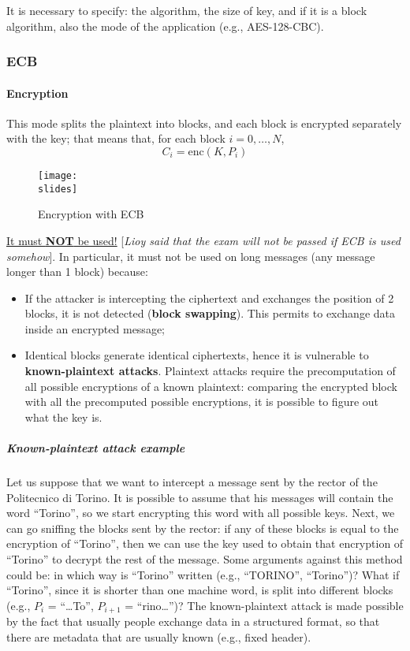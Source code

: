 It is necessary to specify: 
the algorithm, the size of key, and if it is a block algorithm, also the mode of the application (e.g., AES-128-CBC).


\subsubsection{ECB}
\paragraph*{Encryption}
This mode splits the plaintext into blocks, and each block is encrypted separately with the key; 
that means that, for each block \(i = 0, \ldots, N\),
\[
C_i = \text{enc}(K, P_i) 
\]
\begin{figure}[h]
    \centering
    \texttt{[image: \\slides]}
    \caption*{Encryption with ECB}
\end{figure}

\underline{It must \textbf{NOT} be used!} [\textit{Lioy said that the exam will not be passed if ECB is used somehow}]. 
In particular, it must not be used on long messages (any message longer than 1 block) because:
\begin{itemize}
  \item If the attacker is intercepting the ciphertext and exchanges the position of 2 blocks, it is not detected (\textbf{block swapping}). This permits to exchange data inside an encrypted message;
  \item Identical blocks generate identical ciphertexts, hence it is vulnerable to \textbf{known-plaintext attacks}. Plaintext attacks require the precomputation of all possible encryptions of a known plaintext: comparing the encrypted block with all the precomputed possible encryptions, it is possible to figure out what the key is.  
\end{itemize}

\subparagraph*{Known-plaintext attack example}
Let us suppose that we want to intercept a message sent by the rector of the Politecnico di Torino. It is possible
to assume that his messages will contain the word “Torino”, so we start encrypting this word with all possible
keys. Next, we can go sniffing the blocks sent by the rector: if any of these blocks is equal to the encryption
of “Torino”, then we can use the key used to obtain that encryption of “Torino” to decrypt the rest of the
message. Some arguments against this method could be: in which way is “Torino” written (e.g., “TORINO”,
“Torino”)? What if “Torino”, since it is shorter than one machine word, is split into different blocks (e.g., \(P_i\) =
“…To”, \(P_{i+1}\) = “rino…”)? The known-plaintext attack is made possible by the fact that usually people exchange
data in a structured format, so that there are metadata that are usually known (e.g., fixed header).



